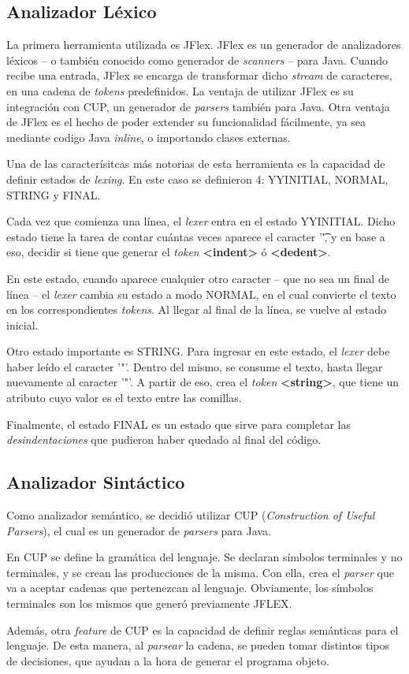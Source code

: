 \documentclass{article}
\begin{document}
\subsection{Analizador Léxico}
\par La primera herramienta utilizada es JFlex. JFlex es un generador de analizadores léxicos – o también conocido como generador de \textit{scanners} – para Java. Cuando recibe una entrada, JFlex se encarga de transformar dicho \textit{stream} de caracteres, en una cadena de \textit{tokens} predefinidos. La ventaja de utilizar JFlex es su integración con CUP, un generador de \textit{parsers} también para Java. Otra ventaja de JFlex es el hecho de poder extender su funcionalidad fácilmente, ya sea mediante codigo Java \textit{inline}, o importando clases externas.
\\
\par Una de las caracterísitcas más notorias de esta herramienta es la capacidad de definir estados de \textit{lexing}. En este caso se definieron 4: YYINITIAL, NORMAL, STRING y FINAL.
\par Cada vez que comienza una línea, el \textit{lexer} entra en el estado YYINITIAL. Dicho estado tiene la tarea de contar cuántas veces aparece el caracter '\t', y en base a eso, decidir si tiene que generar el \textit{token} \textbf{<indent>} ó \textbf{<dedent>}.
\par En este estado, cuando aparece cualquier otro caracter – que no sea un final de línea – el \textit{lexer} cambia su estado a modo NORMAL, en el cual convierte el texto en los correspondientes \textit{tokens}. Al llegar al final de la línea, se vuelve al estado inicial.
\par Otro estado importante es STRING. Para ingresar en este estado, el \textit{lexer} debe haber leído el caracter '"'. Dentro del mismo, se consume el texto, hasta llegar nuevamente al caracter '"'. A partir de eso, crea el \textit{token} \textbf{<string>}, que tiene un atributo cuyo valor es el texto entre las comillas.
\par Finalmente, el estado FINAL es un estado que sirve para completar las \textit{desindentaciones} que pudieron haber quedado al final del código.

\subsection{Analizador Sintáctico}
\par Como analizador semántico, se decidió utilizar CUP  (\textit{Construction of Useful Parsers}), el cual es un generador de \textit{parsers} para Java. 
\par En CUP se define la gramática del lenguaje. Se declaran símbolos terminales y no terminales, y se crean las producciones de la misma. Con ella, crea el \textit{parser} que va a aceptar cadenas que pertenezcan al lenguaje. Obviamente, los símbolos terminales son los mismos que generó previamente JFLEX.
\par Además, otra \textit{feature} de CUP es la capacidad de definir reglas semánticas para el lenguaje. De esta manera, al \textit{parsear} la cadena, se pueden tomar distintos tipos de decisiones, que ayudan a la hora de generar el programa objeto.
\clearpage
\end{document}
